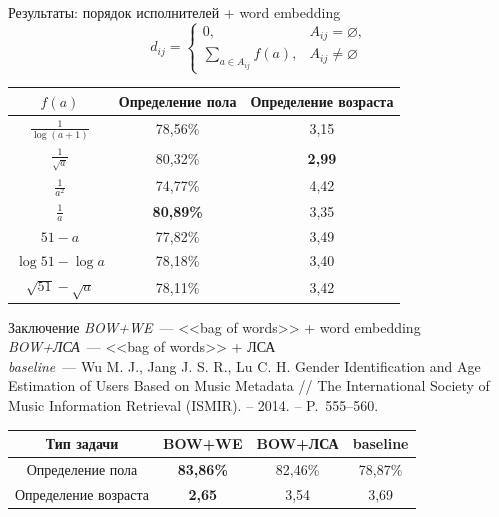 \documentclass{beamer}
\newcommand{\prevGender}{78,87\%}
\newcommand{\prevAge}{3,69}
\begin{document}
\begin{frame}{Результаты: порядок исполнителей + word embedding}
    \[d_{ij} = \begin{cases}
              0,& A_{ij} = \varnothing,\\
              \sum\limits_{a \in A_{ij}}{f(a)},& A_{ij} \ne \varnothing
          \end{cases}\]
\begin{table}[!h]
\centering
\begin{tabular}{|c|c|c|}\hline
    \boldmath$f(a)$ & \textbf{Определение пола} & \textbf{Определение возраста} \\\hline
    $\frac{1}{\log(a + 1)}$ & 78,56\% & 3,15 \\\hline
    $\frac{1}{\sqrt{a}}$ & 80,32\% & \textbf{2,99} \\\hline
    $\frac{1}{a^2}$ & 74,77\% & 4,42 \\\hline
    $\frac{1}{a}$ & \textbf{80,89\%} & 3,35 \\\hline
    $51 - a$ & 77,82\% & 3,49 \\\hline
    $\log{51} - \log{a}$ & 78,18\% & 3,40 \\\hline
    $\sqrt{51} - \sqrt{a}$ & 78,11\% & 3,42 \\\hline
\end{tabular}
\end{table}
\end{frame}

\begin{frame}{Заключение}
    \textit{BOW+WE}~--- <<bag of words>> + word embedding \\
    \textit{BOW+ЛСА}~--- <<bag of words>> + ЛСА \\
    \textit{baseline}~--- Wu M. J.,
        Jang J. S. R., Lu C. H. Gender Identification
        and Age Estimation of Users Based on Music 
        Metadata // The International Society of Music Information Retrieval (ISMIR). – 2014. – P.~555--560.
    \begin{table}[h!]
    \centering
    \begin{tabular}{|c|c|c|c|}
    \hline
    \textbf{Тип задачи} & \textbf{BOW+WE} & \textbf{BOW+ЛСА} & \textbf{baseline} \tabularnewline
    \hline
    Определение пола & \textbf{83,86\%} & 82,46\% & \prevGender \tabularnewline
    \hline
    Определение возраста & \textbf{2,65} & 3,54 & \prevAge \tabularnewline
    \hline
    \end{tabular}
    \label{tab:total_results}
    \end{table}
\end{frame}

\begin{frame}
    \titlepage
\end{frame}
\end{document}
